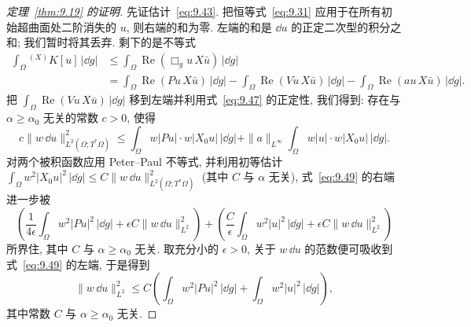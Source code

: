 \begin{proof}[定理~\ref{thm:9.19} 的证明]
先证估计~\eqref{eq:9.43}. 把恒等式~\eqref{eq:9.31} 应用于在所有初始超曲面处二阶消失的 $u$, 则右端的和为零. 左端的和是 $\dd u$ 的正定二次型的积分之和; 我们暂时将其丢弃. 剩下的是不等式
\begin{equation}\label{eq:9.48}
    \begin{aligned}
        \int_{\Omega} {}^{(X)} K[u] \, |\dd g| &\le \int_{\Omega} \operatorname{Re}(\Box_g u \, X \bar u) \, |\dd g| \\
        &= \int_{\Omega} \operatorname{Re}(P u \, X \bar u) \, |\dd g| - \int_{\Omega} \operatorname{Re}(V u \, X \bar u) \, |\dd g| - \int_{\Omega} \operatorname{Re}(a u \, X \bar u) \, |\dd g|.
    \end{aligned}
\end{equation}
把 $\int_{\Omega} \operatorname{Re}(V u \, X \bar u) \, |\dd g|$ 移到左端并利用式~\eqref{eq:9.47} 的正定性, 我们得到: 存在与 $\alpha \ge \alpha_0$ 无关的常数 $c > 0$, 使得
\begin{equation}\label{eq:9.49}
    c \|w \, \dd u\|_{L^2(\Omega; T^* \Omega)}^2 \le \int_{\Omega} w |P u| \cdot w |X_0 u| \, |\dd g| + \|a\|_{L^\infty} \int_{\Omega} w |u| \cdot w |X_0 u| \, |\dd g|.
\end{equation}
对两个被积函数应用 Peter--Paul 不等式, 并利用初等估计 $\int_{\Omega} w^2 |X_0 u|^2 \, |\dd g| \le C \|w \, \dd u\|_{L^2(\Omega; T^* \Omega)}^2$ (其中 $C$ 与 $\alpha$ 无关), 式~\eqref{eq:9.49} 的右端进一步被
\begin{equation}\label{eq:9.50}
    \left( \frac{1}{4\epsilon} \int_{\Omega} w^2 |P u|^2 \, |\dd g| + \epsilon C \|w \, \dd u\|_{L^2}^2 \right) + \left( \frac{C}{\epsilon} \int_{\Omega} w^2 |u|^2 \, |\dd g| + \epsilon C \|w \, \dd u\|_{L^2}^2 \right)
\end{equation}
所界住, 其中 $C$ 与 $\alpha \ge \alpha_0$ 无关. 取充分小的 $\epsilon > 0$, 关于 $w \, \dd u$ 的范数便可吸收到式~\eqref{eq:9.49} 的左端, 于是得到
\begin{equation}\label{eq:9.51}
    \|w \, \dd u\|_{L^2}^2 \le C \left( \int_{\Omega} w^2 |P u|^2 \, |\dd g| + \int_{\Omega} w^2 |u|^2 \, |\dd g| \right),
\end{equation}
其中常数 $C$ 与 $\alpha \ge \alpha_0$ 无关.


\end{proof}
